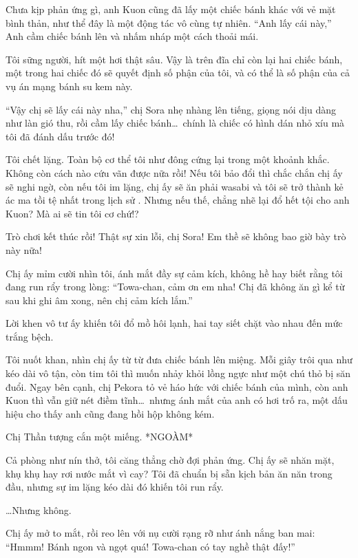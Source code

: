 \documentclass[../main.tex]{subfiles}
\begin{document}
Chưa kịp phản ứng gì, anh Kuon cũng đã lấy một chiếc bánh khác với vẻ mặt bình thản, như thể đây là một động tác vô cùng tự nhiên. ``Anh lấy cái này,'' Anh cầm chiếc bánh lên và nhấm nháp một cách thoải mái.

Tôi sững người, hít một hơi thật sâu. Vậy là trên đĩa chỉ còn lại hai chiếc bánh, một trong hai chiếc đó sẽ quyết định số phận của tôi, và có thể là số phận của cả vụ án mạng bánh su kem này.

``Vậy chị sẽ lấy cái này nha,'' chị Sora nhẹ nhàng lên tiếng, giọng nói dịu dàng như làn gió thu, rồi cầm lấy chiếc bánh\dots\ chính là chiếc có hình dán nhỏ xíu mà tôi đã đánh dấu trước đó!

Tôi chết lặng. Toàn bộ cơ thể tôi như đông cứng lại trong một khoảnh khắc. Không còn cách nào cứu vãn được nữa rồi! Nếu tôi bảo đổi thì chắc chắn chị ấy sẽ nghi ngờ, còn nếu tôi im lặng, chị ấy sẽ ăn phải wasabi và tôi sẽ trở thành kẻ ác ma tồi tệ nhất trong lịch sử \hll. Nhưng nếu thế, chẳng nhẽ lại đổ hết tội cho anh Kuon? Mà ai sẽ tin tôi cơ chứ!?

Trò chơi kết thúc rồi! Thật sự xin lỗi, chị Sora! Em thề sẽ không bao giờ bày trò này nữa!

Chị ấy mỉm cười nhìn tôi, ánh mắt đầy sự cảm kích, không hề hay biết rằng tôi đang run rẩy trong lòng: ``Towa-chan, cảm ơn em nha! Chị đã không ăn gì kể từ sau khi ghi âm xong, nên chị cảm kích lắm.''

Lời khen vô tư ấy khiến tôi đổ mồ hôi lạnh, hai tay siết chặt vào nhau đến mức trắng bệch.


Tôi nuốt khan, nhìn chị ấy từ từ đưa chiếc bánh lên miệng. Mỗi giây trôi qua như kéo dài vô tận, còn tim tôi thì muốn nhảy khỏi lồng ngực như một chú thỏ bị săn đuổi. Ngay bên cạnh, chị Pekora tỏ vẻ háo hức với chiếc bánh của mình, còn anh Kuon thì vẫn giữ nét điềm tĩnh\dots\ nhưng ánh mắt của anh có hơi trố ra, một dấu hiệu cho thấy anh cũng đang hồi hộp không kém.

Chị Thần tượng cắn một miếng. *NGOÀM*

Cả phòng như nín thở, tôi căng thẳng chờ đợi phản ứng. Chị ấy sẽ nhăn mặt, khụ khụ hay rơi nước mắt vì cay? Tôi đã chuẩn bị sẵn kịch bản ăn năn trong đầu, nhưng sự im lặng kéo dài đó khiến tôi run rẩy.

\dots Nhưng không.

Chị ấy mở to mắt, rồi reo lên với nụ cười rạng rỡ như ánh nắng ban mai: ``Hmmm! Bánh ngon và ngọt quá! Towa-chan có tay nghề thật đấy!''
\end{document}

